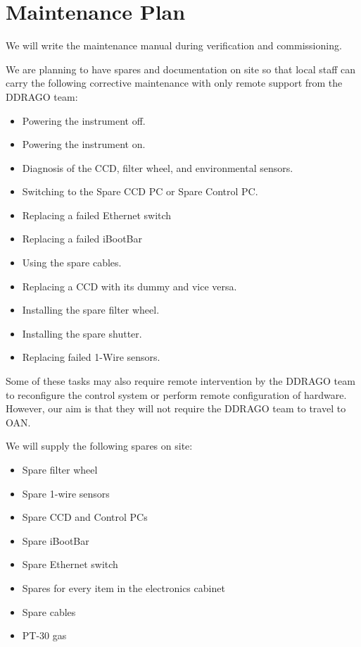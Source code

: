 \documentclass{article}
\begin{document}
\clearpage
\section{Maintenance Plan}

We will write the maintenance manual during verification and commissioning.

We are planning to have spares and documentation on site so that local staff can carry  the following corrective maintenance with only remote support from the DDRAGO team:

\begin{itemize}
\item Powering the instrument off.
\item Powering the instrument on.
\item Diagnosis of the CCD, filter wheel, and environmental sensors.
\item Switching to the Spare CCD PC or Spare Control PC.
\item Replacing a failed Ethernet switch
\item Replacing a failed iBootBar
\item Using the spare cables.
\item Replacing a CCD with its dummy and vice versa.
\item Installing the spare filter wheel.
\item Installing the spare shutter.
\item Replacing failed 1-Wire sensors.
\end{itemize}

Some of these tasks may also require remote intervention by the DDRAGO team to reconfigure the control system or perform remote configuration of hardware. However, our aim is that they will not require the DDRAGO team to travel to OAN.

We will supply the following spares on site:
\begin{itemize}
\item Spare filter wheel
\item Spare 1-wire sensors
\item Spare CCD and Control PCs
\item Spare iBootBar
\item Spare Ethernet switch
\item Spares for every item in the electronics cabinet
\item Spare cables
\item PT-30 gas
\end{itemize}
\end{document}
